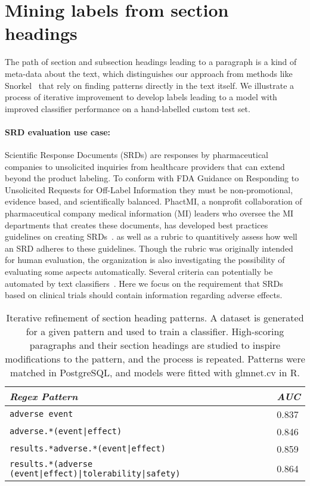 \documentclass[letterpaper]{article} %
\begin{document}
\section{Mining labels from section headings}

The path of section and subsection headings leading to a paragraph is a kind of meta-data about the text, which distinguishes our approach from methods like Snorkel~\cite{ratber2019} that rely on finding patterns directly in the text itself. We illustrate a process of iterative improvement to develop labels leading to a model with improved classifier performance on a hand-labelled custom test set.

\paragraph{\textbf{SRD evaluation use case:}}
Scientific Response Documents (SRDs) are responses by pharmaceutical companies to unsolicited inquiries from healthcare providers that can extend beyond the product labeling. To conform with FDA Guidance on Responding to Unsolicited Requests for Off-Label Information they must be non-promotional, evidence based, and scientifically balanced. 
PhactMI, a nonprofit collaboration of pharmaceutical company medical information (MI) leaders who oversee the MI departments that creates these documents, has developed best practices guidelines on creating SRDs~\cite{ref_SRD_guidelines}.
as well as a rubric to quantitively assess how well an SRD adheres to these guidelines.
Though the rubric was originally intended for human evaluation, the organization is also investigating the possibility of evaluating some aspects automatically. Several criteria can potentially be automated by text classifiers~\cite{lau_2024}. 
Here we focus on the requirement that SRDs based on clinical trials should contain information regarding adverse effects.

\begin{table}
\caption{Iterative refinement of section heading patterns. A dataset is generated for a given pattern and used to train a classifier. 
High-scoring paragraphs and their section headings are studied to inspire modifications to the pattern, and the process is repeated.
Patterns were matched in PostgreSQL, and models were fitted with glmnet.cv in R.
}\label{table:regex}
\begin{tabular}{|l|p{1.0cm}|}
\hline
\textit{\textbf{Regex Pattern}} & \textit{\textbf{AUC}}\\
\hline
\texttt{adverse event} & 0.837 \\
\hline
\texttt{adverse.*(event|effect)} & 0.846 \\
\hline
\texttt{results.*adverse.*(event|effect)} & 0.859 \\
\hline
\texttt{results.*(adverse (event|effect)|tolerability|safety)} & 0.864 \\
\hline
\end{tabular}
\end{table}
\end{document}
